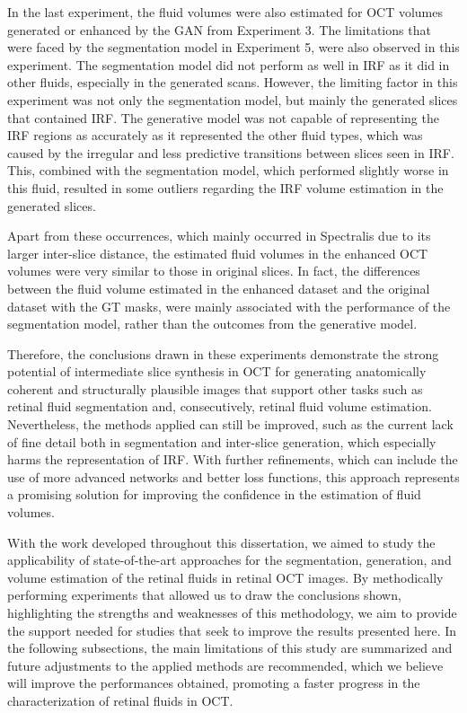 In the last experiment, the fluid volumes were also estimated for OCT volumes generated or enhanced by the GAN from Experiment 3. The limitations that were faced by the segmentation model in Experiment 5, were also observed in this experiment. The segmentation model did not perform as well in IRF as it did in other fluids, especially in the generated scans. However, the limiting factor in this experiment was not only the segmentation model, but mainly the generated slices that contained IRF. The generative model was not capable of representing the IRF regions as accurately as it represented the other fluid types, which was caused by the irregular and less predictive transitions between slices seen in IRF. This, combined with the segmentation model, which performed slightly worse in this fluid, resulted in some outliers regarding the IRF volume estimation in the generated slices.
\par
Apart from these occurrences, which mainly occurred in Spectralis due to its larger inter-slice distance, the estimated fluid volumes in the enhanced OCT volumes were very similar to those in original slices. In fact, the differences between the fluid volume estimated in the enhanced dataset and the original dataset with the GT masks, were mainly associated with the performance of the segmentation model, rather than the outcomes from the generative model.
\par
Therefore, the conclusions drawn in these experiments demonstrate the strong potential of intermediate slice synthesis in OCT for generating anatomically coherent and structurally plausible images that support other tasks such as retinal fluid segmentation and, consecutively, retinal fluid volume estimation. Nevertheless, the methods applied can still be improved, such as the current lack of fine detail both in segmentation and inter-slice generation, which especially harms the representation of IRF. With further refinements, which can include the use of more advanced networks and better loss functions, this approach represents a promising solution for improving the confidence in the estimation of fluid volumes.
\par
With the work developed throughout this dissertation, we aimed to study the applicability of state-of-the-art approaches for the segmentation, generation, and volume estimation of the retinal fluids in retinal OCT images. By methodically performing experiments that allowed us to draw the conclusions shown, highlighting the strengths and weaknesses of this methodology, we aim to provide the support needed for studies that seek to improve the results presented here. In the following subsections, the main limitations of this study are summarized and future adjustments to the applied methods are recommended, which we believe will improve the performances obtained, promoting a faster progress in the characterization of retinal fluids in OCT.

